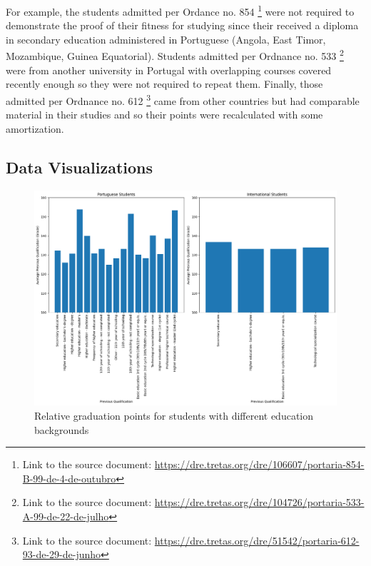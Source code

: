 \documentclass[
  letterpaper,
  DIV=11,
  numbers=noendperiod]{scrartcl}
\begin{document}
For example, the students admitted per Ordance no. 854 \footnote{Link to
  the source document:
  \url{https://dre.tretas.org/dre/106607/portaria-854-B-99-de-4-de-outubro}}
were not required to demonstrate the proof of their fitness for studying
since their received a diploma in secondary education administered in
Portuguese (Angola, East Timor, Mozambique, Guinea Equatorial). Students
admitted per Ordnance no. 533 \footnote{Link to the source document:
  \url{https://dre.tretas.org/dre/104726/portaria-533-A-99-de-22-de-julho}}
were from another university in Portugal with overlapping courses
covered recently enough so they were not required to repeat them.
Finally, those admitted per Ordnance no. 612 \footnote{Link to the
  source document:
  \url{https://dre.tretas.org/dre/51542/portaria-612-93-de-29-de-junho}}
came from other countries but had comparable material in their studies
and so their points were recalculated with some amortization.

\hypertarget{data-visualizations}{%
\subsection{Data Visualizations}\label{data-visualizations}}

\begin{figure}

{\centering \includegraphics{report_AzadhdhinNedalYunisAlFraijat_files/figure-pdf/fig-education-output-1.png}

}

\caption{\label{fig-education}Relative graduation points for students
with different education backgrounds}

\end{figure}
\end{document}
